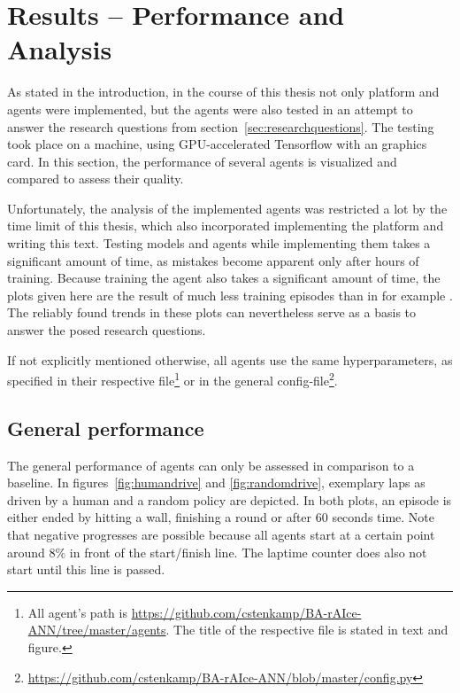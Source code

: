 \chapter{Results -- Performance and Analysis}
\label{ch:resultsanalysis}

As stated in the introduction, in the course of this thesis not only platform and agents were implemented, but the agents were also tested in an attempt to answer the research questions from section~\ref{sec:researchquestions}. The testing took place on a  machine, using GPU-accelerated Tensorflow with an  graphics card. In this section, the performance of several agents is visualized and compared to assess their quality. 

Unfortunately, the analysis of the implemented agents was restricted a lot by the time limit of this thesis, which also incorporated implementing the platform and writing this text. Testing models and agents while implementing them takes a significant amount of time, as mistakes become apparent only after hours of training. Because training the agent also takes a significant amount of time, the plots given here are the result of much less training episodes than in for example \cite{mnih_human-level_2015}. The reliably found trends in these plots can nevertheless serve as a basis to answer the posed research questions.

If not explicitly mentioned otherwise, all agents use the same hyperparameters, as specified in their respective file\footnote{All agent's path is \url{https://github.com/cstenkamp/BA-rAIce-ANN/tree/master/agents}. The title of the respective file is stated in text and figure.} or in the general config-file\footnote{\url{https://github.com/cstenkamp/BA-rAIce-ANN/blob/master/config.py}}.


\section{General performance}

The general performance of agents can only be assessed in comparison to a baseline. In figures~\ref{fig:humandrive} and \ref{fig:randomdrive}, exemplary laps as driven by a human and a random policy are depicted. In both plots, an episode is either ended by hitting a wall, finishing a round or after 60 seconds time. Note that negative progresses are possible because all agents start at a certain point around $8\%$ in front of the start/finish line. The laptime counter does also not start until this line is passed.

